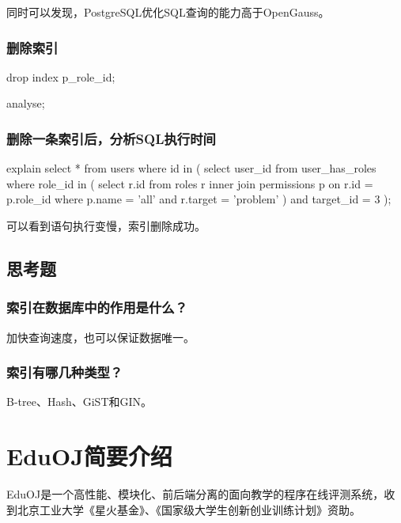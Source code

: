 \documentclass{ctexrep}
\begin{document}
同时可以发现，PostgreSQL优化SQL查询的能力高于OpenGauss。

\subsection{删除索引}
\begin{run}
    drop index p_role_id;
\end{run}
\begin{runsilent}
    analyse;
\end{runsilent}
\subsection{删除一条索引后，分析SQL执行时间}
\begin{run}
    explain select * from users where id in (
        select user_id from user_has_roles where role_id in (
            select r.id from roles r 
            inner join permissions p on r.id = p.role_id 
            where p.name = 'all' and r.target = 'problem'
        ) and target_id = 3
    );
\end{run}
可以看到语句执行变慢，索引删除成功。

\section{思考题}
\subsection*{索引在数据库中的作用是什么？}
加快查询速度，也可以保证数据唯一。
\subsection*{索引有哪几种类型？}
B-tree、Hash、GiST和GIN。


\chapter{EduOJ简要介绍}

EduOJ是一个高性能、模块化、前后端分离的面向教学的程序在线评测系统，收到北京工业大学《星火基金》、《国家级大学生创新创业训练计划》资助。
\end{document}
